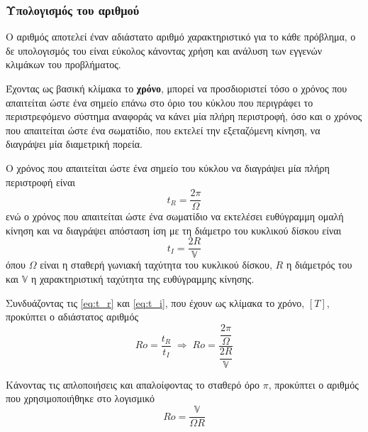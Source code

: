 \subsubsection{Υπολογισμός του αριθμού \ros}
Ο αριθμός \ros αποτελεί έναν αδιάστατο αριθμό χαρακτηριστικό για το κάθε πρόβλημα, ο δε υπολογισμός του είναι εύκολος κάνοντας χρήση και ανάλυση των εγγενών κλιμάκων του προβλήματος.

Έχοντας ως βασική κλίμακα το \textbf{χρόνο}, μπορεί να προσδιοριστεί τόσο ο χρόνος που απαιτείται ώστε ένα σημείο επάνω στο όριο του κύκλου που περιγράφει το περιστρεφόμενο σύστημα αναφοράς να κάνει μία πλήρη περιστροφή, όσο και ο χρόνος που απαιτείται ώστε ένα σωματίδιο, που εκτελεί την εξεταζόμενη κίνηση, να διαγράψει μία διαμετρική πορεία.

Ο χρόνος που απαιτείται ώστε ένα σημείο του κύκλου να διαγράψει μία πλήρη περιστροφή είναι
\begin{equation}
\label{eq:t_r}
t_{R}=\frac{2\pi}{\Omega}
\end{equation}
ενώ ο χρόνος που απαιτείται ώστε ένα σωματίδιο να εκτελέσει ευθύγραμμη ομαλή κίνηση και να διαγράψει απόσταση ίση με τη διάμετρο του κυκλικού δίσκου είναι
\begin{equation}
\label{eq:t_i}
t_{I}=\frac{2R}{\mathbb{V}}
\end{equation}
όπου $Ω$ είναι η σταθερή γωνιακή ταχύτητα του κυκλικού δίσκου, $R$ η διάμετρός του και $\mathbb{V}$ η χαρακτηριστική ταχύτητα της ευθύγραμμης κίνησης.

Συνδυάζοντας τις \ref{eq:t_r} και \ref{eq:t_i}, που έχουν ως κλίμακα το χρόνο, $[T]$, προκύπτει ο αδιάστατος αριθμός \ros
\begin{equation}
\label{eq:ro}
Ro = \dfrac{t_{R}}{t_{I}} \; \Rightarrow \;
Ro = \dfrac{\dfrac{2π}{Ω}}{\dfrac{2R}{\mathbb{V}}}
\end{equation}

Κάνοντας τις απλοποιήσεις και απαλοίφοντας το σταθερό όρο $π$, προκύπτει ο αριθμός \ros που χρησιμοποιήθηκε στο λογισμικό
\begin{equation}
Ro = \dfrac{\mathbb{V}}{ΩR}
\end{equation}